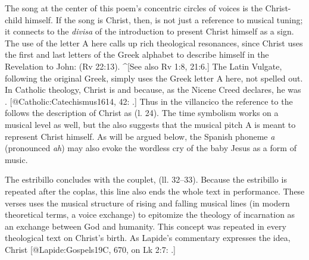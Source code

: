 The song at the center of this poem's concentric circles of voices is the
Christ-child himself.
If the song is Christ, then,  is not just a
reference to musical tuning; it connects to the \emph{divisa} of the introduction to
present Christ himself as a sign.
The use of the letter A here calls up rich theological resonances, since Christ
uses the first and last letters of the Greek alphabet to describe himself in the
Revelation to John:  (Rv 22:13).
^[See also Rv 1:8, 21:6.]
The Latin Vulgate, following the original Greek, simply uses the Greek letter A
here, not spelled out.
In Catholic theology, Christ is  and  because, as the
Nicene Creed declares, he was .
[@Catholic:Catechismus1614, 42: .]
Thus in the villancico the reference to the  follows the description
of Christ as  (l. 24).
The time symbolism works on a musical level as well, but the  also
suggests that the musical pitch A is meant to represent Christ himself.
As will be argued below, the Spanish phoneme \emph{a} (pronounced \emph{ah}) may also evoke
the wordless cry of the baby Jesus as a form of music.

The estribillo concludes with the couplet,  (ll. 32--33).
Because the estribillo is repeated after the coplas, this line also ends the
whole text in performance.
These verses uses the musical structure of rising and falling musical lines (in
modern theoretical terms, a voice exchange) to epitomize the theology of
incarnation as an exchange between God and humanity.
This concept was repeated in every theological text on Christ's birth.
As Lapide's commentary expresses the idea, Christ 
[@Lapide:Gospels19C, 670, on Lk 2:7:
.]


